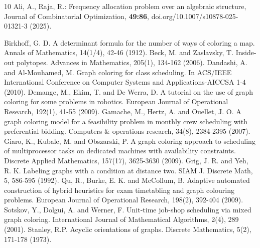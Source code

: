 \documentclass{birkjour}
\theoremstyle{definition}
\theoremstyle{remark}
\numberwithin{equation}{section}
\begin{document}
\begin{thebibliography}{10}
Ali, A., Raja, R.:  Frequency allocation problem over an algebraic structure, Journal of Combinatorial Optimization, {\bf 49:86}, doi.org/10.1007/s10878-025-01321-3 (2025).

Birkhoff, G. D.  A determinant formula for the number of ways of coloring a map. Annals of Mathematics, 14(1/4), 42-46 (1912).
 Beck, M. and Zaslavsky, T. Inside-out polytopes. Advances in Mathematics, 205(1), 134-162 (2006).
Dandashi, A. and Al-Mouhamed, M.  Graph coloring for class scheduling. In ACS/IEEE International Conference on Computer Systems and Applications-AICCSA  1-4 (2010).
Demange, M., Ekim, T. and De Werra, D.  A tutorial on the use of graph coloring for some problems in robotics. European Journal of Operational Research, 192(1), 41-55 (2009).
 Gamache, M., Hertz, A. and Ouellet, J. O. A graph coloring model for a feasibility problem in monthly crew scheduling with preferential bidding. Computers \& operations research, 34(8), 2384-2395 (2007).
 Giaro, K., Kubale, M. and Obszarski, P.  A graph coloring approach to scheduling of multiprocessor tasks on dedicated machines with availability constraints. Discrete Applied Mathematics, 157(17), 3625-3630 (2009).
 Grig, J. R. and Yeh, R. K. Labeling graphs with a condition at distance two. SIAM J. Discrete Math, 5, 586-595 (1992).
 Qu, R., Burke, E. K. and McCollum, B. Adaptive automated construction of hybrid heuristics for exam timetabling and graph colouring problems. European Journal of Operational Research, 198(2), 392-404 (2009).
 Sotskov, Y., Dolgui, A. and Werner, F. Unit-time job-shop scheduling via mixed graph coloring. International Journal of Mathematical Algorithms, 2(4), 289 (2001).
Stanley, R.P. Acyclic orientations of graphs. Discrete Mathematics, 5(2), 171-178 (1973).
 \end{thebibliography}
\end{document}
